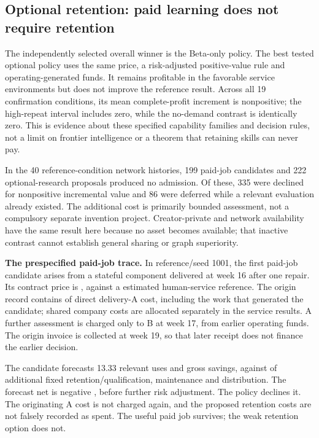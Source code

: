 \subsection{Optional retention: paid learning does not require retention}

The independently selected overall winner is the  Beta-only policy. The best tested optional policy uses the same price, a risk-adjusted positive-value rule and operating-generated funds. It remains profitable in the favorable service environments but does not improve the reference result. Across all 19 confirmation conditions, its mean complete-profit increment is nonpositive; the high-repeat interval includes zero, while the no-demand contrast is identically zero. This is evidence about these specified capability families and decision rules, not a limit on frontier intelligence or a theorem that retaining skills can never pay.

In the 40 reference-condition network histories, 199 paid-job candidates and 222 optional-research proposals produced no admission. Of these, 335 were declined for nonpositive incremental value and 86 were deferred while a relevant evaluation already existed. The additional cost is primarily bounded assessment, not a compulsory separate invention project. Creator-private and network availability have the same result here because no asset becomes available; that inactive contrast cannot establish general sharing or graph superiority.

\textbf{The prespecified paid-job trace.} In reference/seed 1001, the first paid-job candidate arises from a stateful component delivered at week 16 after one repair. Its contract price is , against a  estimated human-service reference. The origin record contains  of direct delivery-A cost, including the work that generated the candidate; shared company costs are allocated separately in the service results. A further  assessment is charged only to B at week 17, from earlier operating funds. The origin invoice is collected at week 19, so that later receipt does not finance the earlier decision.

The candidate forecasts 13.33 relevant uses and  gross savings, against  of additional fixed retention/qualification,  maintenance and  distribution. The forecast net is negative , before further risk adjustment. The policy declines it. The originating A cost is not charged again, and the proposed retention costs are not falsely recorded as spent. The useful paid job survives; the weak retention option does not.

